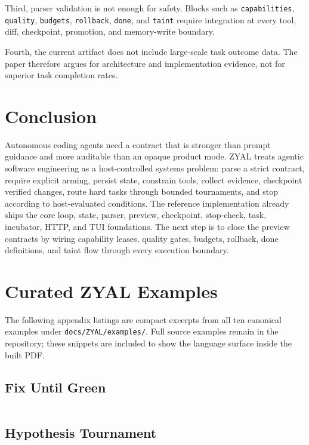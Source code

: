 \documentclass[conference]{IEEEtran}
\newcommand{\ZYAL}{ZYAL}
\begin{document}
Third, parser validation is not enough for safety. Blocks such as \texttt{capabilities}, \texttt{quality}, \texttt{budgets}, \texttt{rollback}, \texttt{done}, and \texttt{taint} require integration at every tool, diff, checkpoint, promotion, and memory-write boundary.

Fourth, the current artifact does not include large-scale task outcome data. The paper therefore argues for architecture and implementation evidence, not for superior task completion rates.

\section{Conclusion}

Autonomous coding agents need a contract that is stronger than prompt guidance and more auditable than an opaque product mode. \ZYAL{} treats agentic software engineering as a host-controlled systems problem: parse a strict contract, require explicit arming, persist state, constrain tools, collect evidence, checkpoint verified changes, route hard tasks through bounded tournaments, and stop according to host-evaluated conditions. The reference implementation already ships the core loop, state, parser, preview, checkpoint, stop-check, task, incubator, HTTP, and TUI foundations. The next step is to close the preview contracts by wiring capability leases, quality gates, budgets, rollback, done definitions, and taint flow through every execution boundary.

\onecolumn
\appendices
\section{Curated \ZYAL{} Examples}

The following appendix listings are compact excerpts from all ten canonical examples under \texttt{docs/ZYAL/examples/}. Full source examples remain in the repository; these snippets are included to show the language surface inside the built PDF.

\subsection{Fix Until Green}
\inputminted{yaml}{listings/fix-until-green.zyal.yml}

\subsection{Hypothesis Tournament}
\inputminted{yaml}{listings/hypothesis-tournament.zyal.yml}
\end{document}
